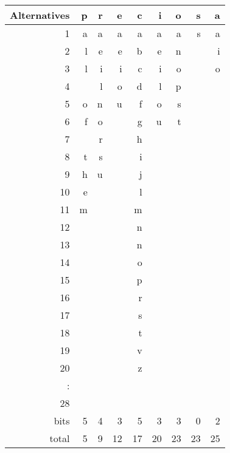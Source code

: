 \begin{tabular}{r|rrrrrrrr}
    Alternatives & p & r & e & c & i & o & s & a\\
    \hline
     1 & a & a & a & a & a & a & s & a\\
     2 & l & e & e & b & e & n &   & i\\
     3 & l & i & i & c & i & o &   & o\\
     4 &   & l & o & d & l & p &   &\\
     5 & o & n & u & f & o & s &   &\\
     6 & f & o &   & g & u & t &   &\\
     7 &   & r &   & h &   &   &   &\\
     8 & t & s &   & i &   &   &   &\\
     9 & h & u &   & j &   &   &   &\\
    10 & e &   &   & l &   &   &   &\\
    11 & m &   &   & m &   &   &   &\\
    12 &   &   &   & n &   &   &   &\\
    13 &   &   &   & ~n &   &   &   &\\
    14 &   &   &   & o &   &   &   &\\
    15 &   &   &   & p &   &   &   &\\
    16 &   &   &   & r &   &   &   &\\
    17 &   &   &   & s &   &   &   &\\
    18 &   &   &   & t &   &   &   &\\
    19 &   &   &   & v &   &   &   &\\
    20 &   &   &   & z &   &   &   &\\
     : &   &   &   &   &   &   &   &\\
    28 &   &   &   &   &   &   &   &\\
    \hline
     bits & 5 & 4 & 3 & 5 & 3 & 3 & 0 & 2\\
     total & 5 & 9 & 12 & 17 & 20 & 23 & 23 & 25
  \end{tabular}
